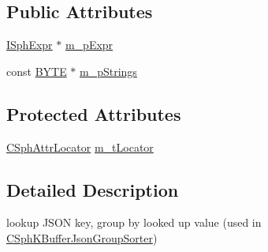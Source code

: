 \subsection*{Public Attributes}
\begin{DoxyCompactItemize}
\item 
\hyperlink{structISphExpr}{I\-Sph\-Expr} $\ast$ \hyperlink{classCSphGrouperJsonField_a14515cdd744c81c8901f7ebfa81d805b}{m\-\_\-p\-Expr}
\item 
const \hyperlink{sphinxstd_8h_a4ae1dab0fb4b072a66584546209e7d58}{B\-Y\-T\-E} $\ast$ \hyperlink{classCSphGrouperJsonField_a8c72ba9aa6cc272978702ce8ae87c647}{m\-\_\-p\-Strings}
\end{DoxyCompactItemize}
\subsection*{Protected Attributes}
\begin{DoxyCompactItemize}
\item 
\hyperlink{structCSphAttrLocator}{C\-Sph\-Attr\-Locator} \hyperlink{classCSphGrouperJsonField_a86460dbb9fd94cb4aacda77002550e51}{m\-\_\-t\-Locator}
\end{DoxyCompactItemize}


\subsection{Detailed Description}
lookup J\-S\-O\-N key, group by looked up value (used in \hyperlink{classCSphKBufferJsonGroupSorter}{C\-Sph\-K\-Buffer\-Json\-Group\-Sorter}) 

